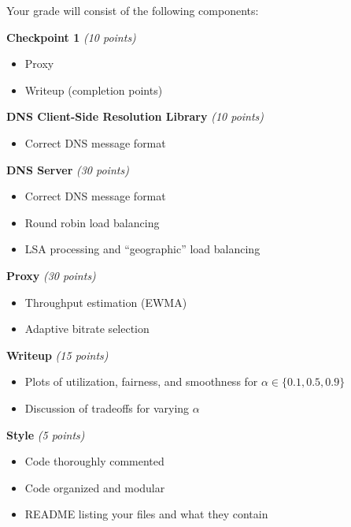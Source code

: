 \documentclass{article}
\begin{document}
Your grade will consist of the following components:

\smallskip \noindent \textbf{Checkpoint 1} \textit{(10 points)}
\begin{itemize}
	\item Proxy
	\item Writeup (completion points)
\end{itemize}

\smallskip \noindent \textbf{DNS Client-Side Resolution Library} \textit{(10 points)}
\begin{itemize}
	\item Correct DNS message format
\end{itemize}

\smallskip \noindent \textbf{DNS Server} \textit{(30 points)}
\begin{itemize}
	\item Correct DNS message format
	\item Round robin load balancing
	\item LSA processing and ``geographic'' load balancing
\end{itemize}

\smallskip \noindent \textbf{Proxy} \textit{(30 points)}
\begin{itemize}
	\item Throughput estimation (EWMA)
	\item Adaptive bitrate selection
\end{itemize}

\smallskip \noindent \textbf{Writeup} \textit{(15 points)}
\begin{itemize}
	\item Plots of utilization, fairness, and smoothness for $\alpha \in \{0.1, 0.5, 0.9\}$
	\item Discussion of tradeoffs for varying $\alpha$
\end{itemize}

\smallskip \noindent \textbf{Style} \textit{(5 points)}
\begin{itemize}
	\item Code thoroughly commented
	\item Code organized and modular
	\item README listing your files and what they contain
\end{itemize}
\end{document}
